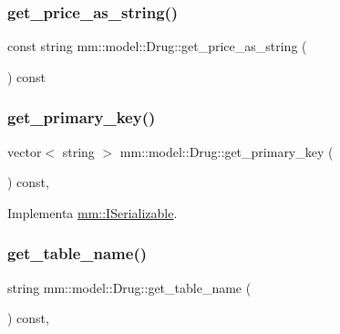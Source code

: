 \subsubsection{\texorpdfstring{get\+\_\+price\+\_\+as\+\_\+string()}{get\_price\_as\_string()}}
{\footnotesize\ttfamily const string mm\+::model\+::\+Drug\+::get\+\_\+price\+\_\+as\+\_\+string (\begin{DoxyParamCaption}{ }\end{DoxyParamCaption}) const}

\mbox{\label{classmm_1_1model_1_1_drug_a019770ab95f95f34bbc204c4c3860bfa}} 
\subsubsection{\texorpdfstring{get\+\_\+primary\+\_\+key()}{get\_primary\_key()}}
{\footnotesize\ttfamily vector$<$ string $>$ mm\+::model\+::\+Drug\+::get\+\_\+primary\+\_\+key (\begin{DoxyParamCaption}{ }\end{DoxyParamCaption}) const\hspace{0.3cm}{\ttfamily [override]}, {\ttfamily [virtual]}}



Implementa \hyperlink{classmm_1_1_i_serializable_a69c0c514e11e386b6cb1fbd03f14da17}{mm\+::\+I\+Serializable}.

\mbox{\label{classmm_1_1model_1_1_drug_a7fa9dbb569b89f397d4b865b778b3751}} 
\subsubsection{\texorpdfstring{get\+\_\+table\+\_\+name()}{get\_table\_name()}}
{\footnotesize\ttfamily string mm\+::model\+::\+Drug\+::get\+\_\+table\+\_\+name (\begin{DoxyParamCaption}{ }\end{DoxyParamCaption}) const\hspace{0.3cm}{\ttfamily [override]}, {\ttfamily [virtual]}}



